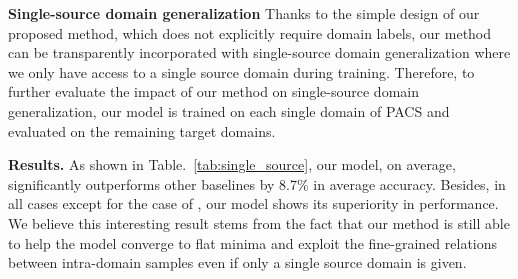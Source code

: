 \documentclass[runningheads]{llncs}
\begin{document}
\noindent \textbf{Single-source domain generalization}
\label{single_src_dg}
Thanks to the simple design of our proposed method, which does not explicitly require domain labels, our method can be transparently incorporated with single-source domain generalization where we only have access to a single source domain during training. Therefore, to further evaluate the impact of our method on single-source domain generalization, our model is trained on each single domain of PACS and evaluated on the remaining target domains.

\noindent \textbf{Results.} As shown in Table.~\ref{tab:single_source}, our model, on average, significantly outperforms other baselines by 8.7\% in average accuracy. Besides, in all cases except for the case of , our model shows its superiority in performance. We believe this interesting result stems from the fact that our method is still able to help the model converge to flat minima and exploit the fine-grained relations between intra-domain samples even if only a single source domain is given.
\end{document}
